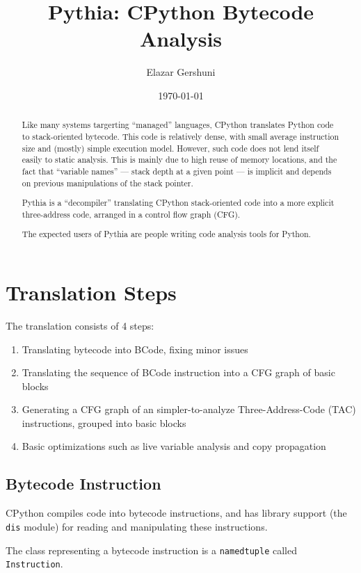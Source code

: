 \documentclass[a4paper]{article}
\title{Pythia: CPython Bytecode Analysis}
\author{Elazar Gershuni}
\date{\today}
\begin{document}
\maketitle

\begin{abstract}

Like many systems targerting ``managed'' languages, CPython translates Python code to stack-oriented bytecode. This code is relatively dense, with small average instruction size and (mostly) simple execution model. However, such code does not lend itself easily to static analysis. This is mainly due to high reuse of memory locations, and the fact that ``variable names'' --- stack depth at a given point --- is implicit and depends on previous manipulations of the stack pointer.

Pythia is a ``decompiler'' translating CPython stack-oriented code into a more explicit three-address code, arranged in a control flow graph (CFG). 

The expected users of Pythia are people writing code analysis tools for Python.

\end{abstract}

\section{Translation Steps}

The translation consists of 4 steps:
\begin{enumerate}
\item Translating bytecode into BCode, fixing minor issues
\item Translating the sequence of BCode instruction into a CFG graph of basic blocks
\item Generating a CFG graph of an simpler-to-analyze Three-Address-Code (TAC) instructions, grouped into basic blocks
\item Basic optimizations such as live variable analysis and copy propagation
\end{enumerate}

\subsection{Bytecode Instruction}
CPython compiles code into bytecode instructions, and has library support (the \texttt{dis} module) for reading and manipulating these instructions.

The class representing a bytecode instruction is a \texttt{namedtuple} called \texttt{Instruction}.
\end{document}
